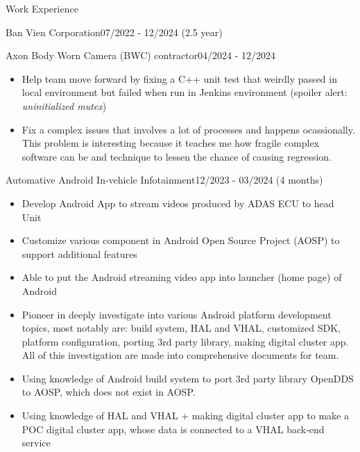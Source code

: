 \documentclass{resume} %
\begin{document}
\begin{rSection}{Work Experience}
\begin{rCompanySubsection}{Ban Vien Corporation}{07/2022 - 12/2024 (2.5 year)}
\begin{rProjectSubsubsectionV2}{Axon Body Worn Camera (BWC) contractor}{04/2024 - 12/2024}
{\begin{itemize}
                \item Help team move forward by fixing a C++ unit test that weirdly passed in local environment but failed when run in Jenkins environment (spoiler alert: \textit{uninitialized mutex})
                \item Fix a complex issues that involves a lot of processes and happens ocassionally. This problem is interesting because it teaches me how fragile complex software can be and technique to lessen the chance of causing regression.
            \end{itemize}
        }
        \end{rProjectSubsubsectionV2}

        \begin{rProjectSubsubsectionV2}{Automative Android In-vehicle Infotainment}{12/2023 - 03/2024 (4 months)}{
            \begin{itemize}
                \item Develop Android App to stream videos produced by ADAS ECU to head Unit
                \item Customize various component in Android Open Source Project (AOSP) to support additional features
            \end{itemize}
        }{
            \begin{itemize}
                \item Able to put the Android streaming video app into launcher (home page) of Android
                \item Pioneer in deeply investigate into various Android platform development topics, most notably are: build system, HAL and VHAL, customized SDK, platform configuration, porting 3rd party library, making digital cluster app. All of this investigation are made into comprehensive documents for team.
                \item Using knowledge of Android build system to port 3rd party library OpenDDS to AOSP, which does not exist in AOSP.
                \item Using knowledge of HAL and VHAL + making digital cluster app to make a POC digital cluster app, whose data is connected to a VHAL back-end service
            \end{itemize}
        }
        \end{rProjectSubsubsectionV2}


\end{rCompanySubsection}
\end{rSection}
\end{document}
